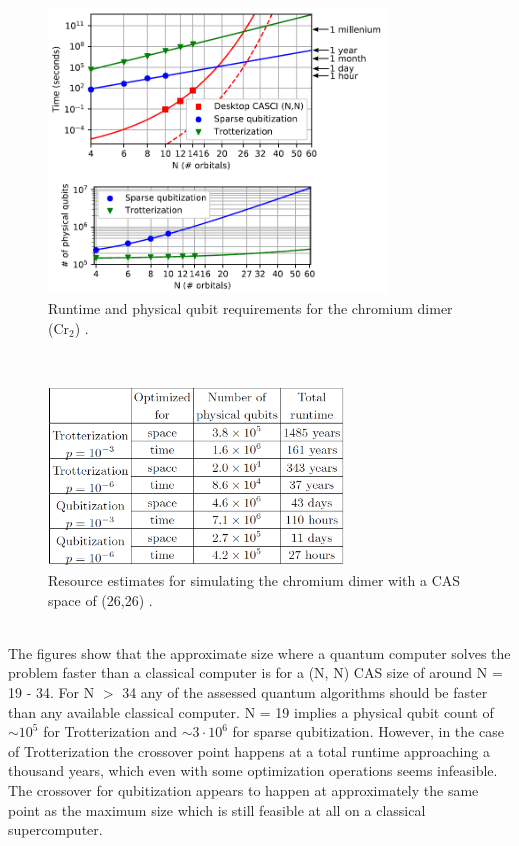 \begin{figure}[ht]
  \centering
  \includegraphics[width=0.8\textwidth]{figures/Runtime chromium dimer.png}
  \caption{Runtime and physical qubit requirements for the chromium dimer (Cr$_2$) \cite{Elfving2020Sep}.} \label{Runtime chromium dimer}
\end{figure} \\
\begin{figure}[ht]
  \centering
  \includegraphics[width=0.7\textwidth]{figures/Resource estimates chromium dimer.png}
  \caption{Resource estimates for simulating the chromium dimer with a CAS space of (26,26) \cite{Elfving2020Sep}.} \label{Resource estimates chromium dimer}
\end{figure} \\
The figures show that the approximate size where a quantum computer solves the problem faster than a classical computer is for a (N, N) CAS size of around N = 19 - 34. For N $>$ 34 any of the assessed quantum algorithms should be faster than any available classical computer. N = 19 implies a physical qubit count of $\sim 10^5$ for Trotterization and $\sim 3 \cdot 10^6$ for sparse qubitization. However, in the case of Trotterization the crossover point happens at a total runtime approaching a thousand years, which even with some optimization operations seems infeasible. The crossover for qubitization appears to happen at approximately the same point as the maximum size which is still feasible at all on a classical supercomputer. \\
